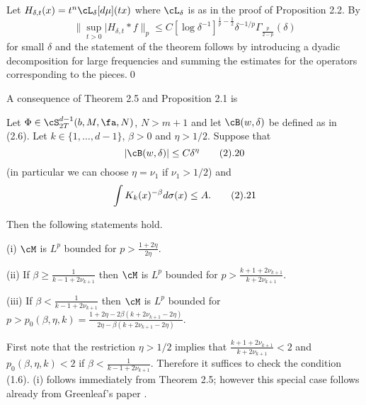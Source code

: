 Let $H_{\delta,t}(x)= t^n \cL_\delta [d\mu](tx)$ where
$\cL_\delta$ is as in the proof of Proposition 2.2. By \cite{18, (4.4)}
$$\big\|\sup_{t>0}|H_{\delta,t}*f\big \|_p\le C 
[\log \delta^{-1}]^{\frac 1p-\frac 12}\delta^{-1/p} 
\Gamma_{\frac{p}{2-p}}(\delta)
$$
for small $\delta$ 
and the statement of the  theorem follows  by introducing a dyadic 
decomposition for large frequencies 
 and summing  the estimates for the operators corresponding
to the pieces.\qed
\enddemo



A consequence of Theorem 2.5 and Proposition 2.1 is

 

 Let $\Phi\in \cS^{d-1}_{2T}(b, M,\fa,N)$, $N>m+1$ and let 
$\cB(w,\delta)$ be defined as in (2.6). 
Let  $k\in \{1,\dots, d-1\}$,  $\beta>0$ and $\eta>1/2$. 
Suppose that
$$
|\cB(w,\delta)|\le C\delta^\eta
\tag 2.20
$$
(in particular we can choose $\eta=\nu_1$ if $\nu_1>1/2$)
 and 
$$
\int K_k(x)^{-\beta} d\sigma(x)\le A.
\tag 2.21
$$

Then the following statements hold.

(i) $\cM$ is $L^p$ bounded
 for $p>\frac{1+2\eta}{2\eta}$.

(ii) If  $\beta\ge\frac 1{k-1+2\nu_{k+1}}$ then
 $\cM$ is $L^p$ bounded for
$p>\frac{k+1+2\nu_{k+1}}{k+2\nu_{k+1}}$.

(iii) If 
$\beta<\frac 1{k-1+2\nu_{k+1}}$ then
 $\cM$ is $L^p$ bounded for
$p>p_0(\beta,\eta, k)=\frac{1+2\eta-2\beta(k+2\nu_{k+1}-2\eta)}
{2\eta-\beta(k+2\nu_{k+1}-2\eta)}.$
\endproclaim


First note that the restriction $\eta>1/2$
implies that 
$\frac{k+1+2\nu_{k+1}}{k+2\nu_{k+1}}<2$ and $p_0(\beta,\eta,k)<2$ if
$\beta<\frac 1{k-1+2\nu_{k+1}}$. Therefore
it suffices to check the condition (1.6). (i) follows immediately from Theorem 2.5; however this special case follows already from Greenleaf's 
paper \cite{11}.

